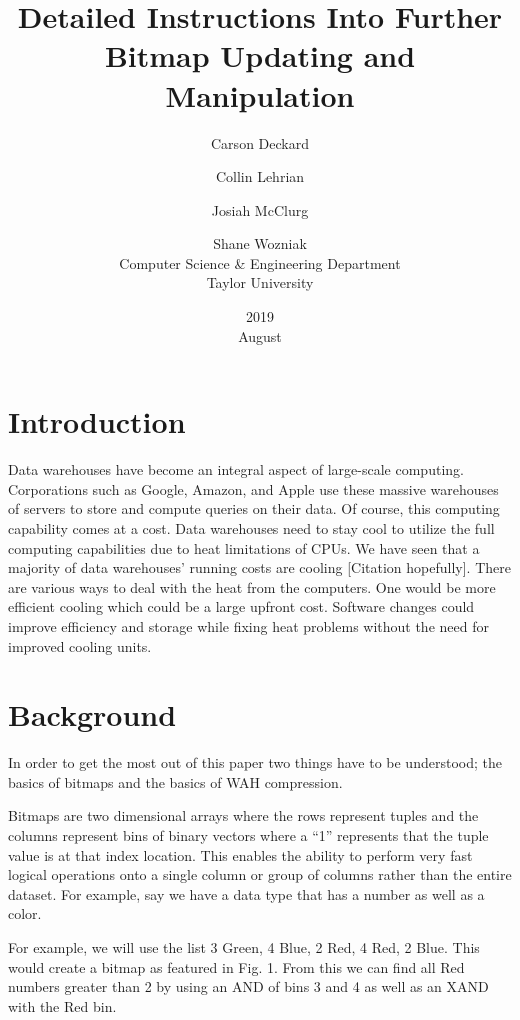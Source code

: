 \documentclass{article}
\title{Detailed Instructions Into Further Bitmap Updating and Manipulation}
\date{2019 \\ August }
\author{Carson Deckard \and Collin Lehrian \and Josiah McClurg \and Shane Wozniak \\ Computer Science & Engineering Department \\ Taylor University}
\begin{document}
\maketitle

%
%
\section{Introduction}
\justify

Data warehouses have become an integral aspect of large-scale computing. Corporations such as Google, Amazon, and Apple use these massive warehouses of servers to store and compute queries on their data. Of course, this computing capability comes at a cost. Data warehouses need to stay cool to utilize the full computing capabilities due to heat limitations of CPUs. We have seen that a majority of data warehouses' running costs are cooling [Citation hopefully].
There are various ways to deal with the heat from the computers. One would be more efficient cooling which could be a large upfront cost. Software changes could improve efficiency and storage while fixing heat problems without the need for improved cooling units.     
%
%
\section{Background}
\justify


In order to get the most out of this paper two things have to be understood; the basics of bitmaps and the basics of WAH compression. \par

Bitmaps are two dimensional arrays where the rows represent tuples and the columns represent bins of binary vectors where a “1” represents that the tuple value is at that index location. This enables the ability to perform very fast logical operations onto a single column or group of columns rather than the entire dataset. For example, say we have a data type that has a number as well as a color. \par

For example, we will use the list 3 Green, 4 Blue, 2 Red, 4 Red, 2 Blue. This would create a bitmap as featured in Fig. 1. From this we can find all Red numbers greater than 2 by using an AND of bins 3 and 4 as well as an XAND with the Red bin. \par
\end{document}
